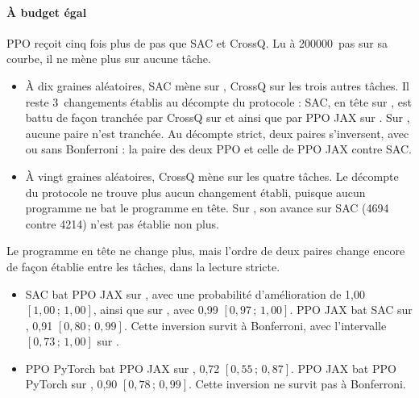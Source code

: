 \paragraph{À budget égal}
PPO reçoit cinq fois plus de pas que SAC et CrossQ. Lu à \num{200000}~pas sur sa courbe, il ne mène plus sur aucune tâche.
\begin{itemize}
  \item À dix graines aléatoires, SAC mène sur , CrossQ sur les trois autres tâches. Il reste
    3~changements établis au décompte du protocole : SAC, en tête sur , est battu de façon
    tranchée par CrossQ sur  et  ainsi que par PPO JAX sur . Sur
    , aucune paire n'est tranchée. Au décompte strict, deux paires s'inversent, avec ou sans
    Bonferroni : la paire des deux PPO et celle de PPO JAX contre SAC.
  \item À vingt graines aléatoires, CrossQ mène sur les quatre tâches. Le décompte du protocole ne trouve
    plus aucun changement établi, puisque aucun programme ne bat le programme en tête. Sur ,
    son avance sur SAC (\num{4694} contre \num{4214}) n'est pas établie non plus.
\end{itemize}
Le programme en tête ne change plus, mais l'ordre de deux paires change encore de façon établie entre les
tâches, dans la lecture stricte.
\begin{itemize}
  \item SAC bat PPO JAX sur , avec une probabilité d'amélioration de 1,00
    $[1{,}00\,;\,1{,}00]$, ainsi que sur , avec 0,99 $[0{,}97\,;\,1{,}00]$. PPO JAX bat SAC sur
    , 0,91 $[0{,}80\,;\,0{,}99]$. Cette inversion survit à Bonferroni, avec l'intervalle
    $[0{,}73\,;\,1{,}00]$ sur .
  \item PPO PyTorch bat PPO JAX sur , 0,72 $[0{,}55\,;\,0{,}87]$. PPO JAX bat PPO
    PyTorch sur , 0,90 $[0{,}78\,;\,0{,}99]$. Cette inversion ne survit pas à Bonferroni.
\end{itemize}

